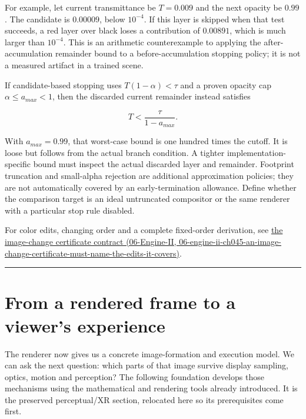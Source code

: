 For example, let current transmittance be \(T=0.009\) and the next opacity be \(0.99\). The candidate is \(0.00009\), below \(10^{-4}\). If this layer is skipped when that test succeeds, a red layer over black loses a contribution of \(0.00891\), which is much larger than \(10^{-4}\). This is an arithmetic counterexample to applying the after-accumulation remainder bound to a before-accumulation stopping policy; it is not a measured artifact in a trained scene.

If candidate-based stopping uses \(T(1-\alpha)<\tau\) and a proven opacity cap \(\alpha\le a_{max}<1\), then the discarded current remainder instead satisfies

\[
T<\frac{\tau}{1-a_{max}}.
\]

With \(a_{max}=0.99\), that worst-case bound is one hundred times the cutoff. It is loose but follows from the actual branch condition. A tighter implementation-specific bound must inspect the actual discarded layer and remainder. Footprint truncation and small-alpha rejection are additional approximation policies; they are not automatically covered by an early-termination allowance. Define whether the comparison target is an ideal untruncated compositor or the same renderer with a particular stop rule disabled.

For color edits, changing order and a complete fixed-order derivation, see \href{../06-Engine-II/main.pdf\#nameddest=06-engine-ii-ch045-an-image-change-certificate-must-name-the-edits-it-covers}{the image-change certificate contract (06-Engine-II, 06-engine-ii-ch045-an-image-change-certificate-must-name-the-edits-it-covers)}.

\begin{center}\rule{0.5\linewidth}{0.5pt}\end{center}

\section{From a rendered frame to a viewer's experience}\label{04-visual-computing-ii-ch041-from-a-rendered-frame-to-a-viewers-experience}

The renderer now gives us a concrete image-formation and execution model. We can ask the next question: which parts of that image survive display sampling, optics, motion and perception? The following foundation develops those mechanisms using the mathematical and rendering tools already introduced. It is the preserved perceptual/XR section, relocated here so its prerequisites come first.

